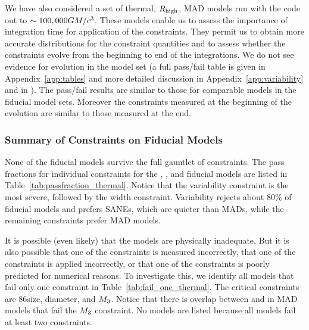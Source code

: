 We have also considered a set of thermal, $R_\mathrm{high}$, MAD models run with the \koral code out to $\sim 100,000GM/c^3$.
These models enable us to assess the importance of integration time for application of the constraints.
They permit us to obtain more accurate distributions for the constraint quantities and to assess whether the constraints evolve from the beginning to end of the integrations.
We do not see evidence for evolution in the \koral model set (a full pass/fail table is given in Appendix~\ref{app:tables}
and more detailed discussion in Appendix~\ref{app:variability} and in \citealt{Georgiev_2022}).
The \koral pass/fail results are similar to those for comparable models in the fiducial model sets.
Moreover the constraints measured at the beginning of the evolution are similar to those measured at the end.

\subsubsection{Summary of Constraints on Fiducial Models}
\label{sec:summarythermal}





None of the fiducial models  survive the full gauntlet of constraints.
The pass fractions for individual constraints for the \bhac, \kharma, and \hamr fiducial models are listed in Table~\ref{tab:passfraction_thermal}.
Notice that the variability constraint is the most severe, followed by the \mring width constraint.
Variability rejects about $80\%$ of fiducial models and prefers SANEs, which are quieter than MADs, while the remaining constraints prefer MAD models.

It is possible (even likely) that the models are physically inadequate.
But it is also possible that one of the constraints is measured incorrectly, that one of the constraints is applied incorrectly, or that one of the constraints is poorly predicted for numerical reasons.
To investigate this, we identify all models that fail only one constraint in Table~\ref{tab:fail_one_thermal}.
The critical constraints are 86\GHz size, \mring diameter, and $M_{3}$.
Notice that there is overlap between \kharma and \bhac in MAD models that fail the $M_{3}$ constraint.
No \hamr models are listed because all \hamr models fail at least two constraints.

